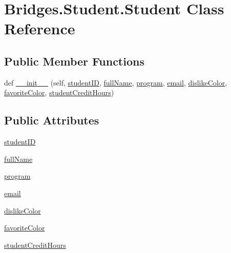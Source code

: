 \hypertarget{class_bridges_1_1_student_1_1_student}{}\section{Bridges.\+Student.\+Student Class Reference}
\label{class_bridges_1_1_student_1_1_student}
\subsection*{Public Member Functions}
\begin{DoxyCompactItemize}
\item 
def \hyperlink{class_bridges_1_1_student_1_1_student_aa275891c43b2559f768987954c81ddc3}{\+\_\+\+\_\+init\+\_\+\+\_\+} (self, \hyperlink{class_bridges_1_1_student_1_1_student_a4eff3044b41f14dfa10f99433a9dc7e6}{student\+I\+D}, \hyperlink{class_bridges_1_1_student_1_1_student_af4cd257640597b8f5cf7dbdac47cffb9}{full\+Name}, \hyperlink{class_bridges_1_1_student_1_1_student_a02127706cb7d187327f7c93052e12722}{program}, \hyperlink{class_bridges_1_1_student_1_1_student_ae4301dc9d41dbf9e61fc94652d7b4616}{email}, \hyperlink{class_bridges_1_1_student_1_1_student_a2799257a9b64d75c13e31aa1fd67c0ad}{dislike\+Color}, \hyperlink{class_bridges_1_1_student_1_1_student_a1d1b07125112a9488193a95c85c3a415}{favorite\+Color}, \hyperlink{class_bridges_1_1_student_1_1_student_a523412548237682929da3c263cefe1b6}{student\+Credit\+Hours})
\end{DoxyCompactItemize}
\subsection*{Public Attributes}
\begin{DoxyCompactItemize}
\item 
\hyperlink{class_bridges_1_1_student_1_1_student_a2d819e6c57cca2531ceb07758f3c68ca}{student\+I\+D}
\item 
\hyperlink{class_bridges_1_1_student_1_1_student_ada26e59fd4a1d226b6e20fc56b7648b0}{full\+Name}
\item 
\hyperlink{class_bridges_1_1_student_1_1_student_ac3aa33f5fd7fa090cba94c5f984fa9f8}{program}
\item 
\hyperlink{class_bridges_1_1_student_1_1_student_ab415f4256531a525c25d5a488ebac289}{email}
\item 
\hyperlink{class_bridges_1_1_student_1_1_student_a396e3211e374055100f49e19fb76e266}{dislike\+Color}
\item 
\hyperlink{class_bridges_1_1_student_1_1_student_ab14eca60ed0a69c4fe7cb411cc808ef6}{favorite\+Color}
\item 
\hyperlink{class_bridges_1_1_student_1_1_student_af5a334e9e2ad9aaa354c420721d67313}{student\+Credit\+Hours}
\end{DoxyCompactItemize}
